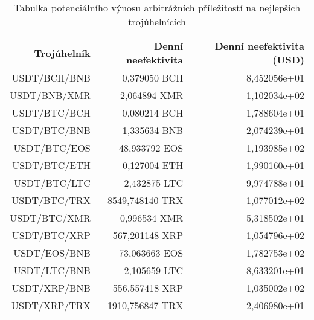 \begin{table}\centering
\caption{Tabulka potenciálního výnosu arbitrážních příležitostí na nejlepších trojúhelnících}
\label{table_gains_best}
\begin{tabular}{|| r | r | r ||}\hline Trojúhelník & Denní neefektivita & Denní neefektivita (USD)\\
 \hline\hline USDT/BCH/BNB & 0,379050 BCH & 8,452056e+01\\ 
 \hline USDT/BNB/XMR & 2,064894 XMR & 1,102034e+02\\ 
 \hline USDT/BTC/BCH & 0,080214 BCH & 1,788604e+01\\ 
 \hline USDT/BTC/BNB & 1,335634 BNB & 2,074239e+01\\ 
 \hline USDT/BTC/EOS & 48,933792 EOS & 1,193985e+02\\ 
 \hline USDT/BTC/ETH & 0,127004 ETH & 1,990160e+01\\ 
 \hline USDT/BTC/LTC & 2,432875 LTC & 9,974788e+01\\ 
 \hline USDT/BTC/TRX & 8549,748140 TRX & 1,077012e+02\\ 
 \hline USDT/BTC/XMR & 0,996534 XMR & 5,318502e+01\\ 
 \hline USDT/BTC/XRP & 567,201148 XRP & 1,054796e+02\\ 
 \hline USDT/EOS/BNB & 73,063663 EOS & 1,782753e+02\\ 
 \hline USDT/LTC/BNB & 2,105659 LTC & 8,633201e+01\\ 
 \hline USDT/XRP/BNB & 556,557418 XRP & 1,035002e+02\\ 
 \hline USDT/XRP/TRX & 1910,756847 TRX & 2,406980e+01\\ 
 \hline
\end{tabular}
\end{table}